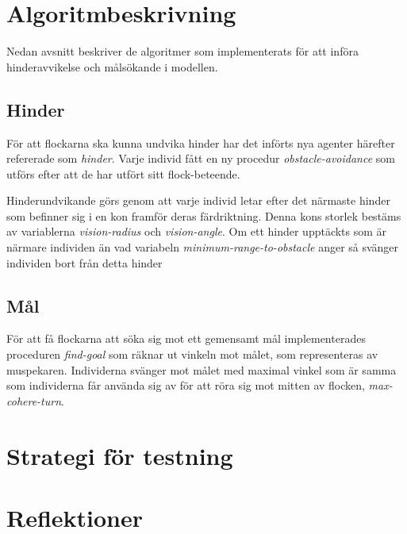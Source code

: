 \documentclass[titlepage, a4paper, 12pt]{article}
\begin{document}
\section{Algoritmbeskrivning}
Nedan avsnitt beskriver de algoritmer som implementerats för att
införa hinderavvikelse och målsökande i modellen.

\subsection{Hinder}
För att flockarna ska kunna undvika hinder har det införts nya agenter
härefter refererade som \textit{hinder}. Varje individ fått en ny
procedur \textit{obstacle-avoidance} som utförs efter att de har
utfört sitt flock-beteende.

Hinderundvikande görs genom att varje individ letar efter det närmaste
hinder som befinner sig i en kon framför deras färdriktning. Denna
kons storlek bestäms av variablerna \textit{vision-radius} och
\textit{vision-angle}. Om ett hinder upptäckts som är närmare
individen än vad variabeln \textit{minimum-range-to-obstacle} anger så
svänger individen bort från detta hinder %

\subsection{Mål}
För att få flockarna att söka sig mot ett gemensamt mål
implementerades proceduren \textit{find-goal} som räknar ut vinkeln
mot målet, som representeras av muspekaren. Individerna svänger mot
målet med maximal vinkel som är samma som individerna får använda sig
av för att röra sig mot mitten av flocken, \textit{max-cohere-turn}.

\section{Strategi för testning}

\section{Reflektioner}

\end{document}
